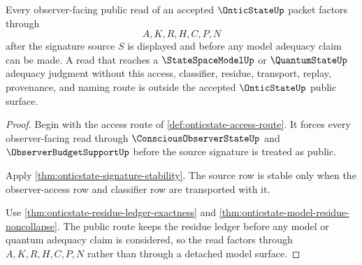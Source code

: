 \begin{theorem}
\label{thm:onticstate-observer-support-factorization}
Every observer-facing public read of an accepted $\OnticStateUp$ packet factors through
$$
A,K,R,H,C,P,N
$$
after the signature source $S$ is displayed and before any model adequacy claim can be made. A read that reaches a $\StateSpaceModelUp$ or $\QuantumStateUp$ adequacy judgment without this access, classifier, residue, transport, replay, provenance, and naming route is outside the accepted $\OnticStateUp$ public surface.
\end{theorem}
\begin{proof}
Begin with the access route of \autoref{def:onticstate-access-route}. It forces every observer-facing read through $\ConsciousObserverStateUp$ and $\ObserverBudgetSupportUp$ before the source signature is treated as public.

Apply \autoref{thm:onticstate-signature-stability}. The source row is stable only when the observer-access row and classifier row are transported with it.

Use \autoref{thm:onticstate-residue-ledger-exactness} and \autoref{thm:onticstate-model-residue-noncollapse}. The public route keeps the residue ledger before any model or quantum adequacy claim is considered, so the read factors through $A,K,R,H,C,P,N$ rather than through a detached model surface.
\end{proof}

